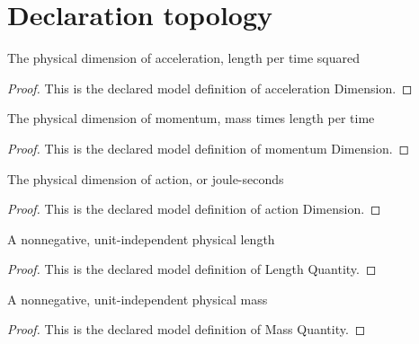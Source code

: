 \section{Declaration topology}
\begin{definition}
  \label{def:physics:phyx-mini-0655:phyxminiproblems-problemphyxmini0655-accelerationdimension}
  The physical dimension of acceleration, length per time squared
\end{definition}
\begin{proof}
  This is the declared model definition of acceleration Dimension.
\end{proof}
\begin{definition}
  \label{def:physics:phyx-mini-0655:phyxminiproblems-problemphyxmini0655-momentumdimension}
  The physical dimension of momentum, mass times length per time
\end{definition}
\begin{proof}
  This is the declared model definition of momentum Dimension.
\end{proof}
\begin{definition}
  \label{def:physics:phyx-mini-0655:phyxminiproblems-problemphyxmini0655-actiondimension}
  The physical dimension of action, or joule-seconds
\end{definition}
\begin{proof}
  This is the declared model definition of action Dimension.
\end{proof}
\begin{definition}
  \label{def:physics:phyx-mini-0655:phyxminiproblems-problemphyxmini0655-lengthquantity}
  A nonnegative, unit-independent physical length
\end{definition}
\begin{proof}
  This is the declared model definition of Length Quantity.
\end{proof}
\begin{definition}
  \label{def:physics:phyx-mini-0655:phyxminiproblems-problemphyxmini0655-massquantity}
  A nonnegative, unit-independent physical mass
\end{definition}
\begin{proof}
  This is the declared model definition of Mass Quantity.
\end{proof}
